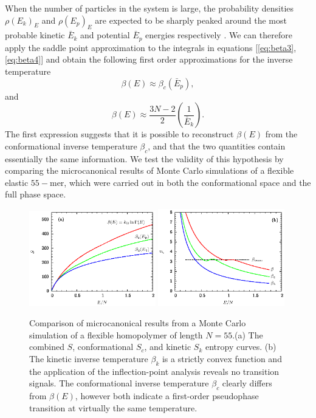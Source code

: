 \documentclass[12pt]{report}
\begin{document}
When the number of particles in the system is large, the probability densities $\rho(E_{k})_{E}$ and $\rho(E_{p})_{E}$ are expected to be sharply peaked around the most probable kinetic $\bar{E}_{k}$ and potential $\bar{E}_{p}$ energies respectively . We can therefore apply the saddle point approximation to the integrals in equations [\ref{eq:beta3}, \ref{eq:beta4}] and obtain the following first order approximations for the inverse temperature
\begin{equation}
\label{eq:approx1}
\beta(E) \approx \beta_{c}(\bar{E}_{p}),
\end{equation}
and
\begin{equation}
\label{eq:approx2}
\beta(E) \approx \frac{3N-2}{2}\left(\frac{1}{\bar{E}_{k}}\right). 
\end{equation}
The first expression suggests that it is possible to reconstruct $\beta(E)$ from the conformational inverse temperature $\beta_{c}$, and that the two quantities contain essentially the same information. We test the validity of this hypothesis by comparing the microcanonical results of Monte Carlo simulations of a flexible elastic $55-$mer, which were carried out in both the conformational space and the full phase space.
\newpage
\begin{figure}
\center
\includegraphics[width = 0.49\textwidth]{chapter2Figs/N55Entropy.eps}
\includegraphics[width = 0.49\textwidth]{chapter2Figs/N55Beta.eps}
\caption{\label{fig:Fig_7}%
Comparison of microcanonical results from a Monte Carlo simulation of a flexible homopolymer of length $N=55$.(a) The combined $S$, conformational $S_{c}$, and kinetic $S_{k}$ entropy curves. (b) The kinetic inverse temperature $\beta_{k}$ is a strictly convex function and the application of the inflection-point analysis reveals no transition signals. The conformational inverse temperature $\beta_{c}$ clearly differs from $\beta(E)$, however both indicate a first-order pseudophase transition at virtually the same temperature. }
\end{figure}
\end{document}
